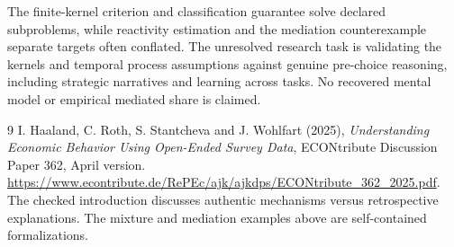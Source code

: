 \documentclass[11pt,a4paper]{article}
\begin{document}
The finite-kernel criterion and classification guarantee solve declared subproblems, while reactivity estimation and the mediation counterexample separate targets often conflated. The unresolved research task is validating the kernels and temporal process assumptions against genuine pre-choice reasoning, including strategic narratives and learning across tasks. No recovered mental model or empirical mediated share is claimed.

\begin{thebibliography}{9}
 I. Haaland, C. Roth, S. Stantcheva and J. Wohlfart (2025), \emph{Understanding Economic Behavior Using Open-Ended Survey Data}, ECONtribute Discussion Paper 362, April version. \url{https://www.econtribute.de/RePEc/ajk/ajkdps/ECONtribute_362_2025.pdf}. The checked introduction discusses authentic mechanisms versus retrospective explanations. The mixture and mediation examples above are self-contained formalizations.
\end{thebibliography}
\end{document}
